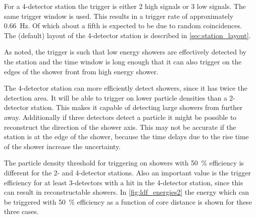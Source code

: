 For a 4-detector station the trigger is either 2 high signals or 3 low signals. The same trigger window is used. This results in a trigger rate of approximately \SI{0.66}{\hertz}. Of which about a fifth is expected to be due to random coincidences. The (default) layout of the 4-detector station is described in \cref{sec:station_layout}.

As noted, the trigger is such that low energy showers are effectively detected by the station and the time window is long enough that it can also trigger on the edges of the shower front from high energy shower.

The 4-detector station can more efficiently detect showers, since it has twice the detection area. It will be able to trigger on lower particle densities than a 2-detector station. This makes it capable of detecting large showers from further away. Additionally if three detectors detect a particle it might be possible to reconstruct the direction of the shower axis. This may not be accurate if the station is at the edge of the shower, because the time delays due to the rise time of the shower increase the uncertainty.

The particle density threshold for triggering on showers with \SI{50}{\percent} efficiency is different for the 2- and 4-detector stations. Also an important value is the trigger efficiency for at least 3-detectors with a hit in the 4-detector station, since this can result in reconstructable showers. In \cref{fig:ldf_energies2} the energy which can be triggered with \SI{50}{\percent} efficiency as a function of core distance is shown for these three cases.

